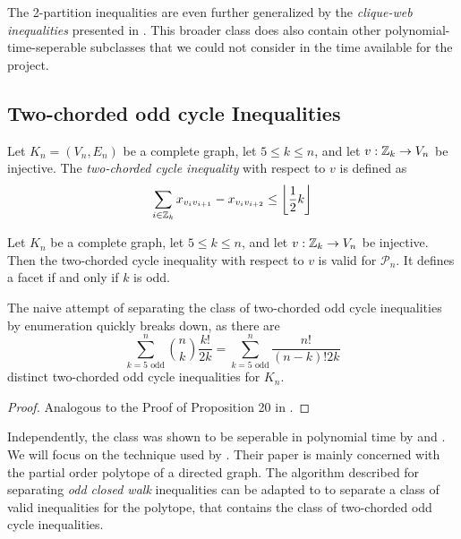 The 2-partition inequalities are even further generalized by the \textit{clique-web inequalities} presented in \cite{dezaCliqueWebFacetsMulticut1992}.
This broader class does also contain other polynomial-time-seperable subclasses that we could not consider in the time available for the project.

\subsection{Two-chorded odd cycle Inequalities}\label{subsec:two_chorded_separator}
\begin{definition}\label{def:2-chorded_cycle_inequality}
	Let $K_{n} = (V_{n}, E_{n})$ be a complete graph, let $5 \leq k \leq n$, and let $v: \mathbb{Z}_{k} \to V_{n}$ be injective.
	The \textit{two-chorded cycle inequality} with respect to $v$ is defined as
	\begin{equation}\label{eq:two-chorded_cycle_inequality}
		\sum_{i \in \mathbb{Z}_{k}}^{} x_{v_{i}v_{i+1}} - x_{v_{i}v_{i+2}} \leq \left\lfloor \frac{1}{2} k \right\rfloor
	\end{equation}
\end{definition}
\begin{theorem}
	Let $K_{n}$ be a complete graph, let $5 \leq k \leq n$, and let $v: \mathbb{Z}_{k} \to V_{n}$ be injective.
	Then the two-chorded cycle inequality with respect to $v$ is valid for $\mathscr{P}_{n}$.
	It defines a facet if and only if $k$ is odd.
\end{theorem}

The naive attempt of separating the class of two-chorded odd cycle inequalities by enumeration quickly breaks down,
as there are 
\[
	\sum_{k=5 \text{ odd}}^{n} \binom{n}{k} \frac{k!}{2k} = \sum_{k = 5 \text{ odd}}^{n} \frac{n!}{(n-k)!2k}
\]
distinct two-chorded odd cycle inequalities for $K_{n}$.
\begin{proof}
	Analogous to the Proof of Proposition 20 in \cite{andresPolyhedralStudyLifted2022}.
\end{proof}

Independently, the class was shown to be seperable in polynomial time by \cite{mullerPartialOrderPolytope1996} and \cite{capraraChvatalGomoryCuts1996}.
We will focus on the technique used by \cite{mullerPartialOrderPolytope1996}.
Their paper is mainly concerned with the partial order polytope of a directed graph.
The algorithm described for separating \textit{odd closed walk} inequalities can be adapted to to separate a class of valid inequalities for the \CP polytope, that contains the class of two-chorded odd cycle inequalities.

